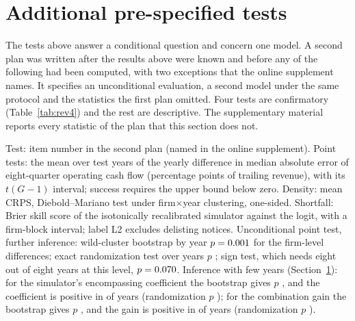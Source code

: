 \section{Additional pre-specified tests}\label{sec:plan4}

The tests above answer a conditional question and concern one model. A second plan was written after the results above were known and before any of the following had been computed, with two exceptions that the online supplement names. It specifies an unconditional evaluation, a second model under the same protocol and the statistics the first plan omitted. Four tests are confirmatory (Table~\ref{tab:rev4}) and the rest are descriptive. The supplementary material reports every statistic of the plan that this section does not.

\begin{table}[t]
\centering\scriptsize
\caption{Confirmatory tests of the second plan}
\label{tab:rev4}
\resizebox{\linewidth}{!}{}
\par\smallskip
\begin{minipage}{\linewidth}\footnotesize
Test: item number in the second plan (named in the online supplement). Point tests: the mean over test years of the yearly difference in median absolute error of eight-quarter operating cash flow (percentage points of trailing revenue), with its $t(G-1)$ interval; success requires the upper bound below zero. Density: mean CRPS, Diebold--Mariano test under firm$\times$year clustering, one-sided. Shortfall: Brier skill score of the isotonically recalibrated simulator against the logit, with a firm-block interval; label L2 excludes delisting notices. Unconditional point test, further inference: wild-cluster bootstrap by year $p=0.001$ for the firm-level differences; exact randomization test over years $p$ \PUncRandPrel{}; sign test, which needs eight out of eight years at this level, $p=0.070$. Inference with few years (Section~\ref{sec:plan4}): for the simulator's encompassing coefficient the bootstrap gives $p$ \PWildEncPrel{}, and the coefficient is positive in \PRandEncPos{} of \PRandEncG{} years (randomization $p$ \PRandEncPrel); for the combination gain the bootstrap gives $p$ \PWildGainPrel{}, and the gain is positive in \PRandGainNeg{} of \PRandGainG{} years (randomization $p$ \PRandGainPrel).
\end{minipage}
\end{table}

